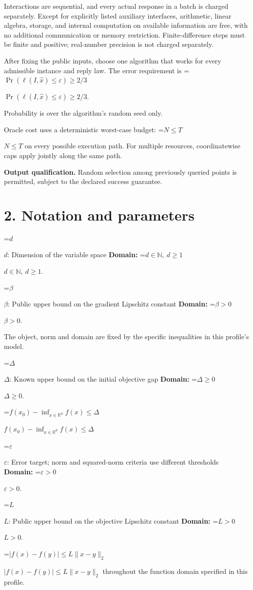 \documentclass[10pt,a4paper]{article}
\newcommand{\AtlasMath}[1]{\par\begingroup\centering\setbox0=\hbox{$\displaystyle #1$}\ifdim\wd0>1.4\linewidth\typeout{ATLAS WIDE FORMULA: \the\wd0}\fi\ifdim\wd0>\linewidth\resizebox{\linewidth}{!}{\box0}\else\box0\fi\par\endgroup}
\newcommand{\AtlasInlineMath}[1]{\begingroup\setbox0=\hbox{$#1$}\ifdim\wd0>.4\linewidth\endgroup\AtlasMath{#1}\else\endgroup$#1$\fi}
\begin{document}
Interactions are sequential, and every actual response in a batch is charged separately. Except for explicitly listed auxiliary interfaces, arithmetic, linear algebra, storage, and internal computation on available information are free, with no additional communication or memory restriction. Finite-difference steps must be finite and positive; real-number precision is not charged separately.

After fixing the public inputs, choose one algorithm that works for every admissible instance and reply law. The error requirement is \AtlasInlineMath{\Pr(\ell(I,\widehat{x})\le \varepsilon)\ge2/3}.

Probability is over the algorithm's random seed only.

Oracle cost uses a deterministic worst-case budget: \AtlasInlineMath{N\le T} on every possible execution path. For multiple resources, coordinatewise caps apply jointly along the same path.

\textbf{Output qualification.} Random selection among previously queried points is permitted, subject to the declared success guarantee.

\section{2. Notation and parameters}
\AtlasInlineMath{d}: Dimension of the variable space \textbf{Domain:} \AtlasInlineMath{d\in\mathbb{N},\ d\ge1}.

\AtlasInlineMath{\beta}: Public upper bound on the gradient Lipschitz constant \textbf{Domain:} \AtlasInlineMath{\beta>0}.

The object, norm and domain are fixed by the specific inequalities in this profile's model.

\AtlasInlineMath{\Delta}: Known upper bound on the initial objective gap \textbf{Domain:} \AtlasInlineMath{\Delta\ge0}.

\AtlasInlineMath{f(x_0)-\inf_{x\in\mathbb{R}^d}f(x)\le\Delta}

\AtlasInlineMath{\varepsilon}: Error target; norm and squared-norm criteria use different thresholds \textbf{Domain:} \AtlasInlineMath{\varepsilon>0}.

\AtlasInlineMath{L}: Public upper bound on the objective Lipschitz constant \textbf{Domain:} \AtlasInlineMath{L>0}.

\AtlasInlineMath{|f(x)-f(y)|\le L\|x-y\|_2} throughout the function domain specified in this profile.
\end{document}

